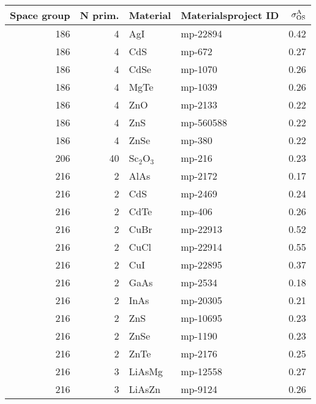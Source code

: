 \begin{table}[t]
\small
\begin{tabular}{rrllr}
\toprule
 Space group &  N prim. &     Material & Materialsproject ID &  $\sigma^\mathrm{A}_\mathrm{OS}$ \\
\midrule         
         186 &            4 &          AgI &   mp-22894 &       0.42 \\
         186 &            4 &          CdS &     mp-672 &       0.27 \\
         186 &            4 &         CdSe &    mp-1070 &       0.26 \\
         186 &            4 &         MgTe &    mp-1039 &       0.26 \\
         186 &            4 &          ZnO &    mp-2133 &       0.22 \\
         186 &            4 &          ZnS &  mp-560588 &       0.22 \\
         186 &            4 &         ZnSe &     mp-380 &       0.22 \\
         206 &           40 &  Sc$_2$O$_3$ &     mp-216 &       0.23 \\
         216 &            2 &         AlAs &    mp-2172 &       0.17 \\
         216 &            2 &          CdS &    mp-2469 &       0.24 \\
         216 &            2 &         CdTe &     mp-406 &       0.26 \\
         216 &            2 &         CuBr &   mp-22913 &       0.52 \\
         216 &            2 &         CuCl &   mp-22914 &       0.55 \\
         216 &            2 &          CuI &   mp-22895 &       0.37 \\
         216 &            2 &         GaAs &    mp-2534 &       0.18 \\
         216 &            2 &         InAs &   mp-20305 &       0.21 \\
         216 &            2 &          ZnS &   mp-10695 &       0.23 \\
         216 &            2 &         ZnSe &    mp-1190 &       0.23 \\
         216 &            2 &         ZnTe &    mp-2176 &       0.25 \\
         216 &            3 &       LiAsMg &   mp-12558 &       0.27 \\
         216 &            3 &       LiAsZn &    mp-9124 &       0.26 \\

\end{tabular}
\end{table}
